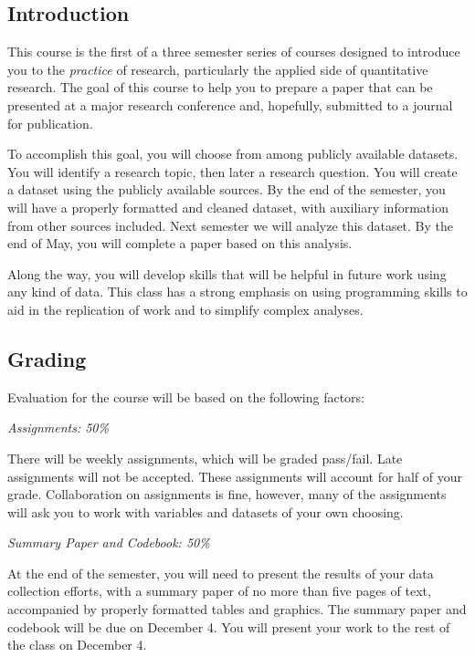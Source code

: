\documentclass[12pt]{article}
\begin{document}
\subsection{Introduction}%
\begin{flushleft}

  This course is the first of a three semester series of courses
  designed to introduce you to the \textit{practice} of research,
  particularly the applied side of quantitative research. The goal of
  this course to help you to prepare a paper that can be presented at
  a major research conference and, hopefully, submitted to a journal
  for publication.

  To accomplish this goal, you will choose from among publicly
  available datasets. You will identify a research topic, then later a
  research question. You will create a dataset using the publicly
  available sources.  By the end of the semester, you will have a
  properly formatted and cleaned dataset, with auxiliary information
  from other sources included. Next semester we will analyze this
  dataset. By the end of May, you will complete a paper based on this
  analysis.

  Along the way, you will develop skills that will be helpful in
  future work using any kind of data. This class has a strong emphasis
  on using programming skills to aid in the replication of work and to
  simplify complex analyses.


\end{flushleft}

\subsection{Grading}%
\begin{flushleft}
Evaluation for the course will be based on the following factors:

\textit{Assignments: 50\%}

There will be weekly assignments, which will be graded pass/fail. Late
assignments will not be accepted. These assignments will account for
half of your grade. Collaboration on assignments is fine, however,
many of the assignments will ask you to work with variables and
datasets of your own choosing.

\textit{Summary Paper and Codebook: 50\%}

At the end of the semester, you will need to present the results of
your data collection efforts, with a summary paper of no more than
five pages of text, accompanied by properly formatted tables and
graphics. The summary paper and codebook will be due on December
4. You will present your work to the rest of the class on December 4.


\end{flushleft}
\end{document}

